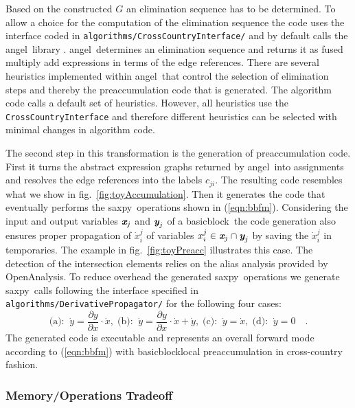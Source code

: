 \documentclass{book}
\newcommand{\angel}{angel}
\newcommand{\basicblock}{basicblock}
\newcommand{\OpenAnalysis}{OpenAnalysis}
\newcommand{\saxpy}{saxpy}
\newcommand{\bmx}{\mbox{\bf\em x}}
\newcommand{\bmy}{\mbox{\bf\em y}}
\newcommand{\reffig}[1]{{fig.~\ref{#1}}}
\newcommand{\refeqn}[1]{{(\ref{#1})}}
\begin{document}
Based on the constructed $G$ an elimination sequence has to be determined.
To allow a choice for the computation of the elimination sequence 
the code uses the interface coded in \lstinline{algorithms/CrossCountryInterface/}
and by default calls the \angel\ library \cite{angelWeb,Albrecht2003Mth,Naumann2003SAf}.
\angel\ determines an elimination sequence and returns it as 
fused multiply add expressions in terms of the edge references.
There are several heuristics implemented within \angel\ that control 
the selection of elimination steps and thereby the preaccumulation code 
that is generated.  The algorithm code calls a default set of heuristics. 
However, all heuristics use the \lstinline{CrossCountryInterface} and therefore 
different heuristics can be selected with minimal changes in algorithm code.   

The second step in this transformation is the generation of 
preaccumulation code. 
First it  turns the abstract expression graphs returned by \angel\ 
into assignments and resolves the edge references into 
the  labels $c_{ji}$. The resulting code resembles what 
we show in  \reffig{fig:toyAccumulation}. 
Then it generates the code that eventually performs the \saxpy\ 
operations shown in \refeqn{eqn:bbfm}. 
Considering the input and output variables $\bmx_j$ and $\bmy_j$ of a \basicblock\ the code generation 
also ensures proper propagation of $\dot{x}_i^j$ of variables $ x_i^j \in  \bmx_j \cap \bmy_j$ 
by saving the $\dot{x}_i^j$ in temporaries. The example in \reffig{fig:toyPreacc} illustrates this case. 
The detection of the intersection elements relies on the alias analysis provided by 
\OpenAnalysis.
To reduce overhead 
the generated \saxpy\ operations we generate \saxpy\ calls following the 
interface specified in \lstinline{algorithms/DerivativePropagator/} for the following four cases:
\begin{equation}\label{eqn:fourSaxpy}  
  \mbox{(a):}\;\;\dot{y} = \frac{\partial y }{\partial x }\cdot \dot{x},\; 
  \mbox{(b):}\;\;\dot{y} = \frac{\partial y }{\partial x }\cdot \dot{x} + \dot{y},\; 
  \mbox{(c):}\;\;\dot{y} = \dot{x},\;
  \mbox{(d):}\;\;\dot{y} = 0\quad .
\end{equation}	
The generated code is executable and represents an overall forward mode 
according to \refeqn{eqn:bbfm} with \basicblock\-local preaccumulation in 
cross-country fashion. 

\subsubsection{Memory/Operations Tradeoff}\label{sec:MMTradeOff}
\end{document}
